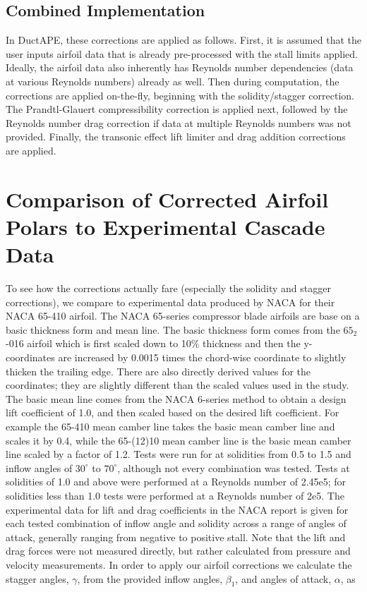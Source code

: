 \subsection{Combined Implementation}

In DuctAPE, these corrections are applied as follows.
%
First, it is assumed that the user inputs airfoil data that is already pre-processed with the stall limits applied.
%
Ideally, the airfoil data also inherently has Reynolds number dependencies (data at various Reynolds numbers) already as well.
%
Then during computation, the corrections are applied on-the-fly, beginning with the solidity/stagger correction.
%
The Prandtl-Glauert compressibility correction is applied next, followed by the Reynolds number drag correction if data at multiple Reynolds numbers was not provided.
%
Finally, the transonic effect lift limiter and drag addition corrections are applied.





\section{Comparison of Corrected Airfoil Polars to Experimental Cascade Data}

To see how the corrections actually fare (especially the solidity and stagger corrections), we compare to experimental data produced by NACA for their NACA 65-410 airfoil.
The NACA 65-series compressor blade airfoils are base on a basic thickness form and mean line.
%
The basic thickness form comes from the \(65_2\)-016 airfoil which is first scaled down to 10\% thickness and then the y-coordinates are increased by 0.0015 times the chord-wise coordinate to slightly thicken the trailing edge.
%
There are also directly derived values for the coordinates; they are slightly different than the scaled values used in the study.
%
The basic mean line comes from the NACA 6-series method to obtain a design lift coefficient of 1.0, and then scaled based on the desired lift coefficient.
%
For example the 65-410 mean camber line takes the basic mean camber line and scales it by 0.4, while the 65-(12)10 mean camber line is the basic mean camber line scaled by a factor of 1.2.
%
Tests were run for at solidities from 0.5 to 1.5 and inflow angles of \(30^\circ\) to \(70^\circ\), although not every combination was tested.
%
Tests at solidities of 1.0 and above were performed at a Reynolds number of 2.45e5; for solidities less than 1.0 tests were performed at a Reynolds number of 2e5.
%
The experimental data for lift and drag coefficients in the NACA report is given for each tested combination of inflow angle and solidity across a range of angles of attack, generally ranging from negative to positive stall.
%
Note that the lift and drag forces were not measured directly, but rather calculated from pressure and velocity measurements.
%
In order to apply our airfoil corrections we calculate the stagger angles, \(\gamma\), from the provided inflow angles, \(\beta_1\), and angles of attack, \(\alpha\), as

